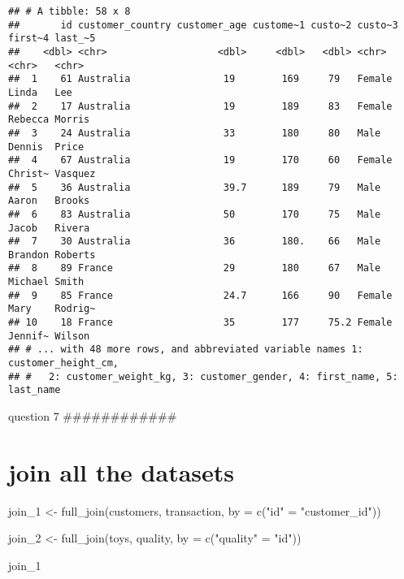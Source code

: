 \documentclass[
]{article}
\newenvironment{Shaded}{\begin{snugshade}}{\end{snugshade}}
\newcommand{\AttributeTok}[1]{\textcolor[rgb]{0.77,0.63,0.00}{#1}}
\newcommand{\FunctionTok}[1]{\textcolor[rgb]{0.00,0.00,0.00}{#1}}
\newcommand{\NormalTok}[1]{#1}
\newcommand{\OtherTok}[1]{\textcolor[rgb]{0.56,0.35,0.01}{#1}}
\newcommand{\StringTok}[1]{\textcolor[rgb]{0.31,0.60,0.02}{#1}}
\begin{document}
\begin{verbatim}
## # A tibble: 58 x 8
##       id customer_country customer_age custome~1 custo~2 custo~3 first~4 last_~5
##    <dbl> <chr>                   <dbl>     <dbl>   <dbl> <chr>   <chr>   <chr>  
##  1    61 Australia                19        169     79   Female  Linda   Lee    
##  2    17 Australia                19        189     83   Female  Rebecca Morris 
##  3    24 Australia                33        180     80   Male    Dennis  Price  
##  4    67 Australia                19        170     60   Female  Christ~ Vasquez
##  5    36 Australia                39.7      189     79   Male    Aaron   Brooks 
##  6    83 Australia                50        170     75   Male    Jacob   Rivera 
##  7    30 Australia                36        180.    66   Male    Brandon Roberts
##  8    89 France                   29        180     67   Male    Michael Smith  
##  9    85 France                   24.7      166     90   Female  Mary    Rodrig~
## 10    18 France                   35        177     75.2 Female  Jennif~ Wilson 
## # ... with 48 more rows, and abbreviated variable names 1: customer_height_cm,
## #   2: customer_weight_kg, 3: customer_gender, 4: first_name, 5: last_name
\end{verbatim}

question 7 \#\#\#\#\#\#\#\#\#\#\#\#

\hypertarget{join-all-the-datasets}{%
\section{join all the datasets}\label{join-all-the-datasets}}

\begin{Shaded}
\begin{Highlighting}[]
\NormalTok{join\_1 }\OtherTok{\textless{}{-}} \FunctionTok{full\_join}\NormalTok{(customers, transaction, }\AttributeTok{by =} \FunctionTok{c}\NormalTok{(}\StringTok{"id"} \OtherTok{=} \StringTok{"customer\_id"}\NormalTok{)) }

\NormalTok{join\_2 }\OtherTok{\textless{}{-}} \FunctionTok{full\_join}\NormalTok{(toys, quality, }\AttributeTok{by =} \FunctionTok{c}\NormalTok{(}\StringTok{"quality"} \OtherTok{=} \StringTok{"id"}\NormalTok{))}

\NormalTok{join\_1}
\end{Highlighting}
\end{Shaded}
\end{document}
